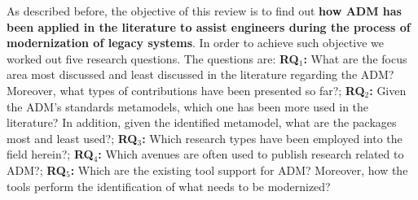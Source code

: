 

As described before, the objective of this review is to find out \textbf{how ADM has been applied in the literature to assist engineers during the process of modernization of legacy systems}. In order to achieve such objective we worked out five research questions. The questions are: \textbf{RQ$_1$:} What are the focus area most discussed and least discussed in the literature regarding the ADM? Moreover, what types of contributions have been presented so far?; \textbf{RQ$_2$:} Given the ADM's standards metamodels, which one has been more used in the literature? In addition, given the identified metamodel, what are the packages most and least used?; \textbf{RQ$_3$:} Which research types have been employed into the field herein?; \textbf{RQ$_4$:} Which avenues are often used to publish research related to ADM?; \textbf{RQ$_5$:} Which are the existing tool support for ADM? Moreover, how the tools perform the identification of what needs to be modernized?










